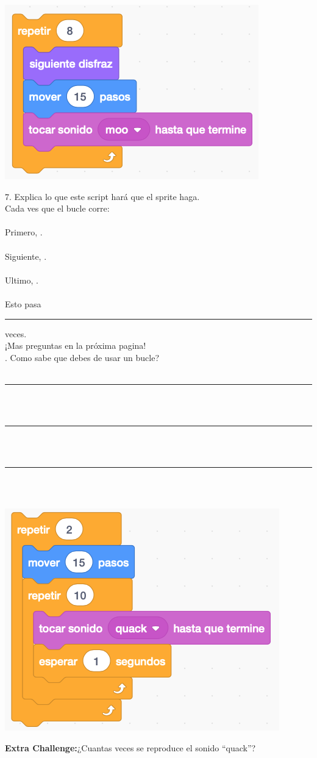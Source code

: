 \documentclass[letterpaper,12pt]{article}
\newcommand\numbox{%
    \fbox{\rule{1in}{0pt}\rule[-1ex]{0pt}{5ex}}}
\begin{document}
\noindent \dotfill

\begin{center}
\includegraphics[scale=.8]{q7_script0.png}
\end{center}
7. Explica lo que este script hará que el sprite haga. \\
Cada ves que el bucle corre: \\ \\
\indent Primero, \hrulefill. \\ \\
\indent Siguiente, \hrulefill. \\ \\
\indent Ultimo, \hrulefill. \\ \\
 Esto pasa \rule{1cm}{0.5pt} veces. \\

\noindent ¡Mas preguntas en la próxima pagina! \dotfill \\

. Como sabe que debes de usar un bucle?  \\ \\
\noindent \rule{18.5cm}{0.5pt} \\ \\
\noindent \rule{18.5cm}{0.5pt} \\ \\
\noindent \rule{18.5cm}{0.5pt} \\

\noindent \dotfill \\
\begin{center}
\includegraphics[scale=.8]{ec_script0.png}
\end{center}

\noindent \textbf{Extra Challenge:}¿Cuantas veces se reproduce el sonido “quack”? \numbox
\end{document}
